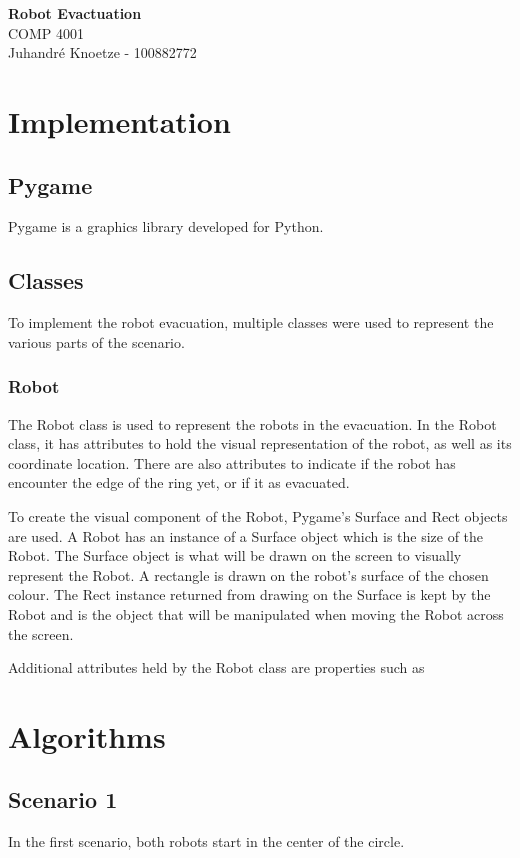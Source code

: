 \documentclass[12pt,letterpaper]{article}
\begin{document}
    \begin{center}
        {\Large\bf Robot Evactuation} \\
        \vspace{0.25em}
        {\large COMP 4001}\\
        \vspace{0.25em}
        Juhandr\'{e} Knoetze - 100882772 \\
    \end{center}

    \section{Implementation}
    \subsection{Pygame}
        Pygame is a graphics library developed for Python.
    
    \subsection{Classes}
        To implement the robot evacuation, multiple classes were used to represent the various parts of the scenario.
        
    \subsubsection{Robot}
        The Robot class is used to represent the robots in the evacuation. In the Robot class, it has attributes to hold the visual representation of the robot, as well as its coordinate location. There are also attributes to indicate if the robot has encounter the edge of the ring yet, or if it as evacuated.
        
        To create the visual component of the Robot, Pygame's Surface and Rect objects are used. A Robot has an instance of a Surface object which is the size of the Robot. The Surface object is what will be drawn on the screen to visually represent the Robot. A rectangle is drawn on the robot's surface of the chosen colour. The Rect instance returned from drawing on the Surface is kept by the Robot and is the object that will be manipulated when moving the Robot across the screen.
        
        Additional attributes held by the Robot class are properties such as
        
    \section{Algorithms}
    \subsection{Scenario 1}
        In the first scenario, both robots start in the center of the circle. 
\end{document}

